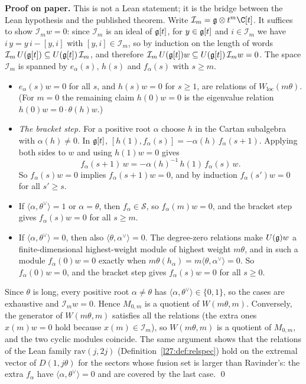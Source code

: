 \textbf{Proof on paper.} This is not a Lean statement; it is the bridge between the Lean hypothesis and the published theorem.
Write $\mathcal I_m=\ltwentyseveng\otimes t^m\C[t]$. It suffices to show $\mathcal I_mw=0$: since $\mathcal I_m$ is an ideal of
$\mathfrak g[t]$, for $y\in\mathfrak g[t]$ and $i\in\mathcal I_m$ we have $i\,y=y\,i-[y,i]$ with $[y,i]\in\mathcal I_m$, so by
induction on the length of words $\mathcal I_m\,U(\mathfrak g[t])\subseteq U(\mathfrak g[t])\,\mathcal I_m$, and therefore
$\mathcal I_m\,U(\mathfrak g[t])w\subseteq U(\mathfrak g[t])\,\mathcal I_mw=0$. The space $\mathcal I_m$ is spanned by
$e_\alpha(s)$, $h(s)$ and $f_\alpha(s)$ with $s\ge m$.
\begin{itemize}
\item $e_\alpha(s)w=0$ for all $s$, and $h(s)w=0$ for $s\ge1$, are relations of $W_{\mathrm{loc}}(m\theta)$. (For $m=0$ the
  remaining claim $h(0)w=0$ is the eigenvalue relation $h(0)w=0\cdot\theta(h)w$.)
\item \emph{The bracket step.} For a positive root $\alpha$ choose $h$ in the Cartan subalgebra with $\alpha(h)\neq0$. In
  $\mathfrak g[t]$, $[h(1),f_\alpha(s)]=-\alpha(h)\,f_\alpha(s+1)$. Applying both sides to $w$ and using $h(1)w=0$ gives
  \begin{equation*}
  f_\alpha(s+1)\,w=-\alpha(h)^{-1}\,h(1)\,f_\alpha(s)\,w .
  \end{equation*}
  So $f_\alpha(s)w=0$ implies $f_\alpha(s+1)w=0$, and by induction $f_\alpha(s')w=0$ for all $s'\ge s$.
\item If $\langle\alpha,\theta^\vee\rangle=1$ or $\alpha=\theta$, then $f_\alpha\in\mathcal S$, so $f_\alpha(m)w=0$, and the
  bracket step gives $f_\alpha(s)w=0$ for all $s\ge m$.
\item If $\langle\alpha,\theta^\vee\rangle=0$, then also $\langle\theta,\alpha^\vee\rangle=0$. The degree-zero relations make
  $U(\mathfrak g)w$ a finite-dimensional highest-weight module of highest weight $m\theta$, and in such a module
  $f_\alpha(0)w=0$ exactly when $m\theta(h_\alpha)=m\langle\theta,\alpha^\vee\rangle=0$. So $f_\alpha(0)w=0$, and the bracket
  step gives $f_\alpha(s)w=0$ for all $s\ge0$.
\end{itemize}
Since $\theta$ is long, every positive root $\alpha\neq\theta$ has $\langle\alpha,\theta^\vee\rangle\in\{0,1\}$, so the cases are
exhaustive and $\mathcal I_mw=0$. Hence $M_{0,m}$ is a quotient of $W(m\theta,m)$. Conversely, the generator of $W(m\theta,m)$
satisfies all the relations (the extra ones $x(m)w=0$ hold because $x(m)\in\mathcal I_m$), so $W(m\theta,m)$ is a quotient of
$M_{0,m}$, and the two cyclic modules coincide. The same argument shows that the relations of the Lean family
$\mathrm{rav}(j,2j)$ (Definition~\ref{l27:def:relspec}) hold on the extremal vector of $D(1,j\theta)$ for the sectors whose
fusion set is larger than Ravinder's: the extra $f_\alpha$ have $\langle\alpha,\theta^\vee\rangle=0$ and are covered by the last
case. \qed

